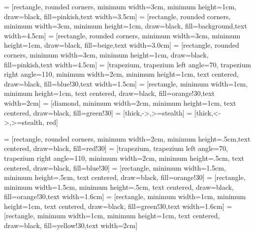 \usepackage{graphicx}
\usepackage{hyperref, url}
\hypersetup{colorlinks,citecolor=myorange,filecolor=red,linkcolor=brown,urlcolor=blue}

\usepackage{longtable,booktabs}

\usepackage{animate}
\usepackage{subfig}
\usepackage{tikz}
\usetikzlibrary{shapes.geometric, arrows,shapes.symbols,decorations.pathreplacing}
 = [rectangle, rounded corners, minimum width=3cm, minimum height=1cm, draw=black, fill=pinkish,text width=3.5cm]
 = [rectangle, rounded corners, minimum width=3cm, minimum height=1cm, draw=black, fill=background,text width=4.5cm]
 = [rectangle, rounded corners, minimum width=3cm, minimum height=1cm, draw=black, fill=beige,text width=3.0cm]
 = [rectangle, rounded corners, minimum width=3cm, minimum height=1cm, draw=black, fill=pinkish,text width=4.5cm]
 = [trapezium, trapezium left angle=70, trapezium right angle=110, minimum width=2cm, minimum height=1cm, text centered, draw=black, fill=blue!30,text width=1.5cm]
 = [rectangle, minimum width=1cm, minimum height=1cm, text centered, draw=black, fill=orange!30,text width=2cm]
 = [diamond, minimum width=2cm, minimum height=1cm, text centered, draw=black, fill=green!30]
 = [thick,->,>=stealth]
 = [thick,<->,>=stealth, red]


 = [rectangle, rounded corners, minimum width=2cm, minimum height=.5cm,text centered, draw=black, fill=red!30]
 = [trapezium, trapezium left angle=70, trapezium right angle=110, minimum width=2cm, minimum height=.5cm, text centered, draw=black, fill=blue!30]
 = [rectangle, minimum width=1.5cm, minimum height=.5cm, text centered, draw=black, fill=orange!30]
 = [rectangle, minimum width=1.5cm, minimum height=.5cm, text centered, draw=black, fill=orange!30,text width=1.6cm]
 = [rectangle, minimum width=1cm, minimum height=1cm, text centered, draw=black, fill=green!30,text width=1.6cm]
 = [rectangle, minimum width=1cm, minimum height=1cm, text centered, draw=black, fill=yellow!30,text width=2cm]

\usepackage{pifont}%
\newcommand{\cmark}{\ding{51}}%
\newcommand{\xmark}{\ding{55}}%

\usepackage{ulem} %


